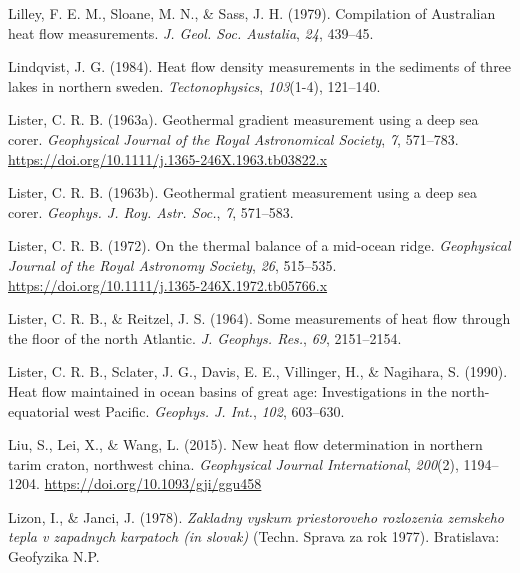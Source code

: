 \documentclass[draft,linenumbers]{agujournal2018}
\begin{document}
\leavevmode{}%
Lilley, F. E. M., Sloane, M. N., \& Sass, J. H. (1979). Compilation of
{Australian} heat flow measurements. \emph{J. Geol. Soc. Austalia},
\emph{24}, 439--45.

\leavevmode{}%
Lindqvist, J. G. (1984). Heat flow density measurements in the sediments
of three lakes in northern sweden. \emph{Tectonophysics},
\emph{103}(1-4), 121--140.

\leavevmode{}%
Lister, C. R. B. (1963a). Geothermal gradient measurement using a deep
sea corer. \emph{Geophysical Journal of the Royal Astronomical Society},
\emph{7}, 571--783.
\url{https://doi.org/10.1111/j.1365-246X.1963.tb03822.x}

\leavevmode{}%
Lister, C. R. B. (1963b). Geothermal gratient measurement using a deep
sea corer. \emph{Geophys. J. Roy. Astr. Soc.}, \emph{7}, 571--583.

\leavevmode{}%
Lister, C. R. B. (1972). On the thermal balance of a mid-ocean ridge.
\emph{Geophysical Journal of the Royal Astronomy Society}, \emph{26},
515--535. \url{https://doi.org/10.1111/j.1365-246X.1972.tb05766.x}

\leavevmode{}%
Lister, C. R. B., \& Reitzel, J. S. (1964). Some measurements of heat
flow through the floor of the north {Atlantic}. \emph{J. Geophys. Res.},
\emph{69}, 2151--2154.

\leavevmode{}%
Lister, C. R. B., Sclater, J. G., Davis, E. E., Villinger, H., \&
Nagihara, S. (1990). Heat flow maintained in ocean basins of great age:
Investigations in the north-equatorial west {Pacific}. \emph{Geophys. J.
Int.}, \emph{102}, 603--630.

\leavevmode{}%
Liu, S., Lei, X., \& Wang, L. (2015). New heat flow determination in
northern tarim craton, northwest china. \emph{Geophysical Journal
International}, \emph{200}(2), 1194--1204.
\url{https://doi.org/10.1093/gji/ggu458}

\leavevmode{}%
Lizon, I., \& Janci, J. (1978). \emph{Zakladny vyskum priestoroveho
rozlozenia zemskeho tepla v zapadnych karpatoch (in slovak)} (Techn.
Sprava za rok 1977). Bratislava: Geofyzika N.P.
\end{document}
